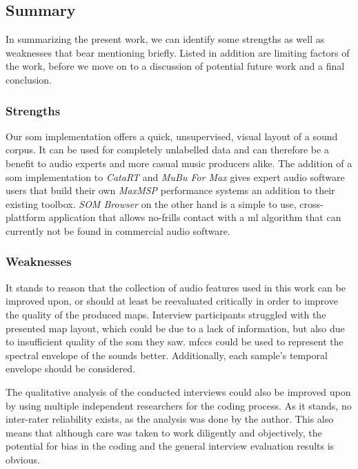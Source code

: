 \subsection{Summary}
\label{subsec:discussion_summary}
In summarizing the present work, we can identify some strengths as well as
weaknesses that bear mentioning briefly. Listed in addition are limiting factors
of the work, before we move on to a discussion of potential future work and a
final conclusion.

\subsubsection{Strengths}
\label{subsubsec:discussion_strengths}
Our \gls{som} implementation offers a quick, unsupervised, visual layout of a
sound corpus. It can be used for completely unlabelled data and can therefore
be a benefit to audio experts and more casual music producers alike.
The addition of a \gls{som} implementation to \textit{CataRT} and \textit{MuBu
For Max} gives expert audio software users that build their own \textit{MaxMSP}
performance systems an addition to their existing toolbox. \textit{SOM Browser}
on the other hand is a simple to use, cross-plattform application that
allows no-frills contact with a \gls{ml} algorithm that can currently not be
found in commercial audio software.

\subsubsection{Weaknesses}
\label{subsubsec:discussion_weaknesses}
It stands to reason that the collection of audio features used in this work can
be improved upon, or should at least be reevaluated critically in order to
improve the quality of the produced maps. Interview participants struggled with
the presented map layout, which could be due to a lack of information, but also
due to insufficient quality of the \gls{som} they saw. \glspl{mfcc} could be
used to represent the spectral envelope of the sounds better. Additionally,
each sample's temporal envelope should be considered.

\smallskip

The qualitative analysis of the conducted interviews could also be improved upon
by using multiple independent researchers for the coding process. As it stands,
no inter-rater reliability exists, as the analysis was done by the author. This
also means that although care was taken to work diligently and objectively, the
potential for bias in the coding and the general interview evaluation
results is obvious.

